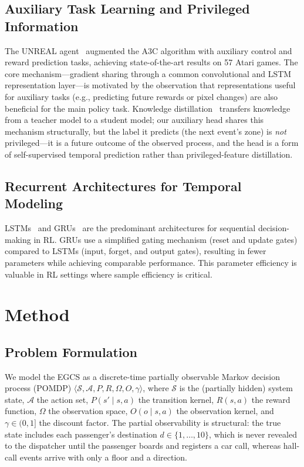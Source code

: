 \documentclass{ieeeaccess}
\begin{document}
\subsection{Auxiliary Task Learning and Privileged Information}

The UNREAL agent~\cite{jaderberg2017unreal} augmented the A3C
algorithm with auxiliary control and reward prediction tasks,
achieving state-of-the-art results on 57 Atari games. The core
mechanism---gradient sharing through a common convolutional and LSTM
representation layer---is motivated by the observation that
representations useful for auxiliary tasks (e.g., predicting future
rewards or pixel changes) are also beneficial for the main policy
task. Knowledge distillation~\cite{hinton2015distilling} transfers
knowledge from a teacher model to a student model; our auxiliary head
shares this mechanism structurally, but the label it predicts (the
next event's zone) is \emph{not} privileged---it is a future
outcome of the observed process, and the head is a form of
self-supervised temporal prediction rather than privileged-feature
distillation.

\subsection{Recurrent Architectures for Temporal Modeling}

LSTMs~\cite{hochreiter1997long} and GRUs~\cite{cho2014learning} are
the predominant architectures for sequential decision-making in RL.
GRUs use a simplified gating mechanism (reset and update gates)
compared to LSTMs (input, forget, and output gates), resulting in
fewer parameters while achieving comparable performance. This
parameter efficiency is valuable in RL settings where sample
efficiency is critical.

\section{Method}
\label{sec:method}

\subsection{Problem Formulation}

We model the EGCS as a discrete-time partially observable Markov
decision process (POMDP) $\langle \mathcal{S}, \mathcal{A}, P, R,
\Omega, O, \gamma \rangle$, where $\mathcal{S}$ is the (partially
hidden) system state, $\mathcal{A}$ the action set, $P(s' \mid s, a)$
the transition kernel, $R(s, a)$ the reward function, $\Omega$ the
observation space, $O(o \mid s, a)$ the observation kernel, and
$\gamma \in (0, 1]$ the discount factor. The partial observability
is structural: the true state includes each passenger's destination
$d \in \{1, \dots, 10\}$, which is never revealed to the dispatcher
until the passenger boards and registers a car call, whereas
hall-call events arrive with only a floor and a direction.
\end{document}
